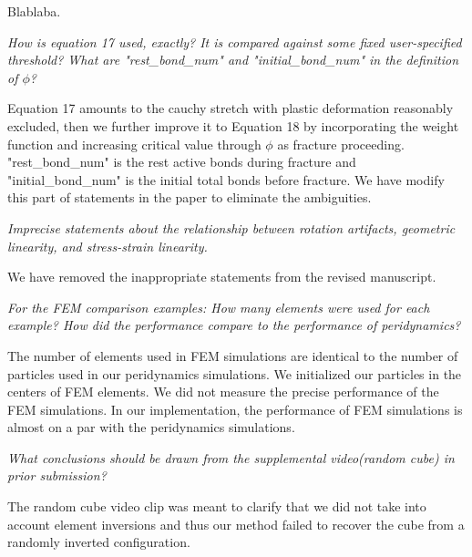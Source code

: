 Blablaba.

\emph{How is equation 17 used, exactly? It is compared against some fixed user-specified threshold? What are "rest\_bond\_num" and "initial\_bond\_num" in the definition of $\phi$?}

Equation 17 amounts to the cauchy stretch with plastic deformation reasonably excluded, then we further improve it to Equation 18 by incorporating the weight function and increasing critical value through $\phi$ as fracture proceeding. "rest\_bond\_num" is the rest active bonds during fracture and "initial\_bond\_num" is the initial total bonds before fracture. We have modify this part of statements in the paper to eliminate the ambiguities.

\emph{Imprecise statements about the relationship between rotation artifacts, geometric linearity, and stress-strain linearity.}

We have removed the inappropriate statements from the revised manuscript.

\emph{For the FEM comparison examples: How many elements were used for each example? How did the performance compare to the performance of peridynamics?}

The number of elements used in FEM simulations are identical to the number of particles used in our peridynamics simulations. We initialized our particles in the centers of FEM elements. We did not measure the precise performance of the FEM simulations. In our implementation, the performance of FEM simulations is almost on a par with the peridynamics simulations.

\emph{What conclusions should be drawn from the supplemental video(random cube) in prior submission?}

The random cube video clip was meant to clarify that we did not take into account element inversions and thus our method failed to recover the cube from a randomly inverted configuration.


%





